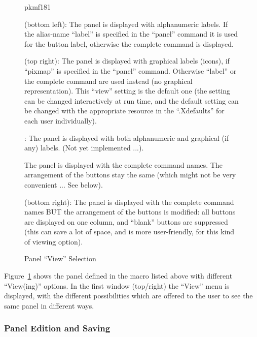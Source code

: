 \begin{figure}[htb]
\begin{PICTf}[.6]{pkmf181}
\begin{DLsf}{}
\item {} (bottom left):
The panel is displayed with alphanumeric labels. If the alias-name ``label''
is specified in the ``panel'' command it is used for the button label,
otherwise the complete command is displayed.
\item {} (top right):
The panel is displayed with graphical labels (icons), if ``pixmap''
is specified in the ``panel'' command. Otherwise ``label'' or the
complete command are used instead (no graphical representation).
This ``view'' setting is the default one (the setting can be changed
interactively at run time, and the default setting can be changed
with the appropriate resource in the ``.Xdefaults'' for each user
individually).
\end{DLsf}
\end{PICTf}
\vspace{.5\baselineskip}
\begin{DLsf}{}
\item {}:
The panel is displayed with both alphanumeric and graphical (if
any) labels.  (Not yet implemented ...).
\item {}
The panel is displayed with the complete command names. The arrangement
of the buttons stay the same (which might not be very convenient ...
See below).
\item {} (bottom right):
The panel is displayed with the complete command names BUT
the arrangement of the buttons is modified: all buttons are displayed
on one column, and ``blank'' buttons are suppressed (this can save
a lot of space, and is more user-friendly, for this kind of
viewing option).
\vspace{-1\baselineskip}
\end{DLsf}
\caption{Panel ``View'' Selection}
\label{ref:FIGPKMF181}
\end{figure}
 
Figure~\ref{ref:FIGPKMF181} shows the panel
defined in the macro listed above with different ``View(ing)'' options.
In the first window (top/right) the ``View'' menu is displayed,
with the different
possibilities which are offered to the user to see the same panel
in different ways.
 
 
\subsubsection{Panel Edition and Saving}
\label{ref:reedpanel}

